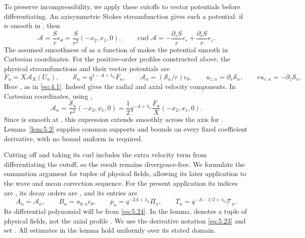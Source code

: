 To preserve incompressibility, we apply these cutoffs to vector potentials before differentiating.
An axisymmetric Stokes streamfunction  gives such a potential: if
 is smooth in , then
\[
 \mathcal A=\frac Sr e_\theta=\frac S{r^2}(-x_2,x_1,0),
 \qquad
 \operatorname{curl}\mathcal A=-\frac{\partial_zS}{r}e_r+\frac{\partial_rS}{r}e_z.
\]
The assumed smoothness of  as a function of
 makes the potential smooth in Cartesian coordinates. For the
positive-order profiles constructed above, the physical streamfunctions and their vector potentials
are
\begin{equation}
 F_n=X\mathcal A_X(U_n),
 \qquad \mathcal S_n=q^{1-A+\lambda_n}F_n,
 \qquad \mathcal A_n=(\mathcal S_n/r)e_\theta,
 \qquad
 u_{z,n}=\partial_s\mathcal S_n,
 \qquad ru_{r,n}=-\partial_z\mathcal S_n.
 \tag{5.27}\label{eq:5.27}
\end{equation}
Here , as in \eqref{eq:4.1}. Indeed
 gives the radial and
axial velocity components. In Cartesian coordinates, using ,
\[
 \mathcal A_n=\frac{\mathcal S_n}{r^2}(-x_2,x_1,0)
 =\frac12q^{-A+\lambda_n}\frac{F_n}{X}(-x_2,x_1,0).
\]
Since  is smooth at , this expression extends
smoothly across the axis for . Lemma~\ref{lem:5.2} supplies common
supports and bounds on every fixed coefficient derivative, with no bound uniform in
 required.

Cutting off  and taking its curl includes the extra velocity term
from differentiating the cutoff, so the result remains divergence-free. We formulate the summation
argument for tuples of physical fields, allowing its later application to the wave and mean correction
sequence. For the present application its indices are , its decay orders are
, and its entries are
\[
 A_n=\mathcal A_n,
 \qquad B_n=u_{\theta,n}e_\theta,
 \qquad p_n=q^{-2A+\lambda_n}\Pi_n,
 \qquad T_n=q^{-A-1/2+\lambda_n}\mathcal T_n.
\]
Its differential polynomial will be  from
\eqref{eq:5.24}. In the lemma,  denotes a tuple of physical fields, not the
axial profile . We use the derivative notation \eqref{eq:5.23} and
set . All estimates in the lemma hold uniformly
over its stated domain.

